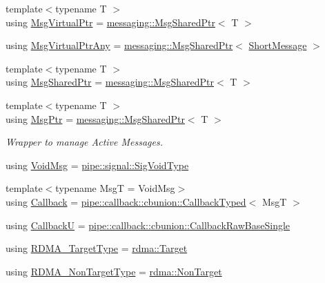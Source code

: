 \begin{DoxyCompactItemize}
\item 
{\footnotesize template$<$typename T $>$ }\\using \hyperlink{namespacevt_a82b5c92ea7ca3ddd2e8a2e27df87fa1a}{Msg\+Virtual\+Ptr} = \hyperlink{structvt_1_1messaging_1_1_msg_shared_ptr}{messaging\+::\+Msg\+Shared\+Ptr}$<$ T $>$
\item 
using \hyperlink{namespacevt_a54674b9f819f4f3a652c6f78d9b62aaf}{Msg\+Virtual\+Ptr\+Any} = \hyperlink{structvt_1_1messaging_1_1_msg_shared_ptr}{messaging\+::\+Msg\+Shared\+Ptr}$<$ \hyperlink{namespacevt_a1125ac1da6c0bbf141e0ea0739d7602d}{Short\+Message} $>$
\item 
{\footnotesize template$<$typename T $>$ }\\using \hyperlink{namespacevt_ab2b3d506ec8e8d1540aede826d84a239}{Msg\+Shared\+Ptr} = \hyperlink{structvt_1_1messaging_1_1_msg_shared_ptr}{messaging\+::\+Msg\+Shared\+Ptr}$<$ T $>$
\item 
{\footnotesize template$<$typename T $>$ }\\using \hyperlink{namespacevt_a9f5ebd62ee9d6dd8829e3e1cc4f858e9}{Msg\+Ptr} = \hyperlink{structvt_1_1messaging_1_1_msg_shared_ptr}{messaging\+::\+Msg\+Shared\+Ptr}$<$ T $>$
\begin{DoxyCompactList}\small\item\em Wrapper to manage Active Messages. \end{DoxyCompactList}\item 
using \hyperlink{namespacevt_ae108c204035ac2513c8d09e6971a4a31}{Void\+Msg} = \hyperlink{namespacevt_1_1pipe_1_1signal_acbe257d1ae44f20fa9fd9b6ed3057caf}{pipe\+::signal\+::\+Sig\+Void\+Type}
\item 
{\footnotesize template$<$typename MsgT  = Void\+Msg$>$ }\\using \hyperlink{namespacevt_a36db99df4c973d48b1118a293fff533f}{Callback} = \hyperlink{structvt_1_1pipe_1_1callback_1_1cbunion_1_1_callback_typed}{pipe\+::callback\+::cbunion\+::\+Callback\+Typed}$<$ MsgT $>$
\item 
using \hyperlink{namespacevt_af79a43a97bc3593fc349f086c874c48e}{CallbackU} = \hyperlink{structvt_1_1pipe_1_1callback_1_1cbunion_1_1_callback_raw_base_single}{pipe\+::callback\+::cbunion\+::\+Callback\+Raw\+Base\+Single}
\item 
using \hyperlink{namespacevt_a9bf03a57102d0274cc229b9ef94bb59e}{R\+D\+M\+A\+\_\+\+Target\+Type} = \hyperlink{structvt_1_1rdma_1_1_target}{rdma\+::\+Target}
\item 
using \hyperlink{namespacevt_ae5bd2866e5ee83f4d6a53e8730cd3202}{R\+D\+M\+A\+\_\+\+Non\+Target\+Type} = \hyperlink{structvt_1_1rdma_1_1_non_target}{rdma\+::\+Non\+Target}

\end{DoxyCompactItemize}
